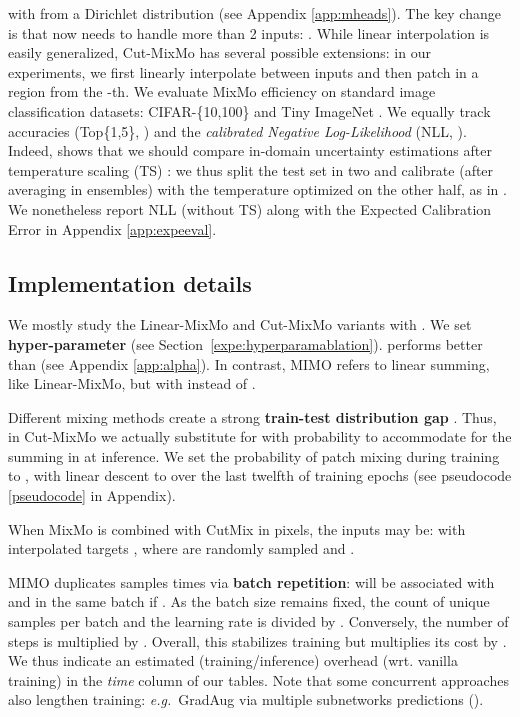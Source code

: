 \documentclass[10pt,twocolumn,letterpaper]{article}
\begin{document}
with  from a Dirichlet distribution (see Appendix \ref{app:mheads}). The key change is that  now needs to
handle more than 2 inputs: . While linear
interpolation is easily generalized, Cut-MixMo has several possible extensions:
in our experiments, we first linearly interpolate between  inputs and then
patch in a region from the -th.%
\label{expe:experiments}We evaluate MixMo efficiency on standard image classification datasets: CIFAR-\{10,100\} \cite{krizhevsky2009learning} and Tiny ImageNet \cite{chrabaszcz2017}. We equally track accuracies (Top\{1,5\}, ) and the \textit{calibrated Negative Log-Likelihood} (NLL,
). Indeed, \cite{ashukha2020pitfalls} shows that we should compare in-domain uncertainty estimations after temperature scaling (TS) \cite{guo2017calibration}: we thus split the test set in two and calibrate (after averaging in ensembles) with the temperature optimized on the other half, as in \cite{lobacheva2020power,rame2021dice}. We nonetheless report NLL (without TS) along with the Expected Calibration Error \cite{naeini2015obtaining} in Appendix \ref{app:expeeval}.\subsection{Implementation details}
We mostly study the Linear-MixMo and Cut-MixMo variants with
. We set \textbf{hyper-parameter}  (see Section~\ref{expe:hyperparamablation}).  performs better than  (see Appendix \ref{app:alpha}). In contrast, MIMO \cite{havasi2020raining} refers to linear summing, like Linear-MixMo, but with
 instead of .

Different mixing methods create a strong \textbf{train-test distribution
gap} \cite{onmixup2020,gontijo2020affinity}. Thus, in Cut-MixMo we actually substitute  for 
with probability  to accommodate for the summing in  at inference. We set the probability of patch mixing during training to , with linear descent to  over the last twelfth of training epochs (see pseudocode \ref{pseudocode} in Appendix).

When MixMo is combined with CutMix in pixels, the inputs may be:  with interpolated targets , where  are randomly sampled and .

MIMO duplicates samples  times via \textbf{batch repetition}:
 will be associated with  and  in the same batch
if . As the batch size remains fixed, the count of unique
samples per batch and the learning rate is divided by . Conversely, the
number of steps is multiplied by . Overall, this stabilizes training but multiplies
its cost by . We thus indicate an estimated (training/inference) overhead (wrt. vanilla training) in the \textit{time} column of our tables. Note that some concurrent approaches also lengthen training: \textit{e.g.}\ GradAug \cite{yang2020radaug} via multiple subnetworks predictions ().
\end{document}
